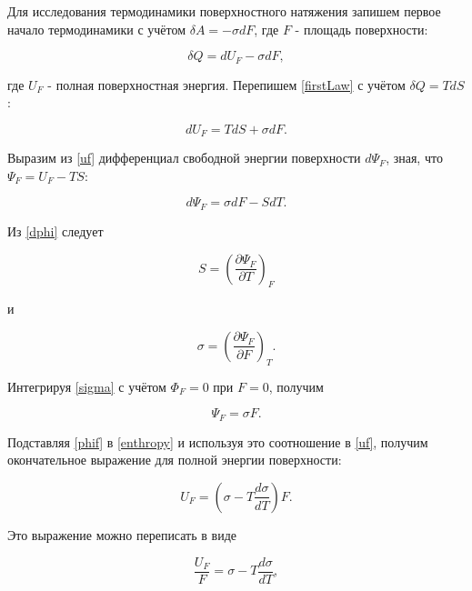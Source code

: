 \documentclass[a4paper,12pt]{article} %
\begin{document}
Для исследования термодинамики поверхностного натяжения запишем первое начало термодинамики с учётом $\delta A = -\sigma dF$, где $F$ - площадь поверхности:

\begin{equation}
    \delta Q = dU_F - \sigma dF,
    \label{firstLaw}
\end{equation}

где $U_F$ - полная поверхностная энергия. Перепишем \eqref{firstLaw} с учётом $\delta Q = TdS$:

\begin{equation}
    dU_F = TdS + \sigma dF.
    \label{uf}
\end{equation}

Выразим из \eqref{uf} дифференциал свободной энергии поверхности $d\Psi_F$, зная, что $\Psi_F = U_F - TS$:

\begin{equation}
    d\Psi_F = \sigma dF - SdT.
    \label{dphi}
\end{equation}

Из \eqref{dphi} следует

\begin{equation}
    S = (\frac{\partial\Psi_F}{\partial T})_F
    \label{enthropy}
\end{equation}

и

\begin{equation}
    \sigma = (\frac{\partial\Psi_F}{\partial F})_T.
    \label{sigma}
\end{equation}

Интегрируя \eqref{sigma} с учётом $\Phi_F = 0$ при $F = 0$, получим

\begin{equation}
    \Psi_F = \sigma F.
    \label{phif}
\end{equation}

Подставляя \eqref{phif} в \eqref{enthropy} и используя это соотношение в \eqref{uf}, получим окончательное выражение для полной энергии поверхности:

\begin{equation}
    U_F = (\sigma - T\frac{d\sigma}{dT})F.
\end{equation}

Это выражение можно переписать в виде

\begin{equation}
    \frac{U_F}{F} = \sigma - T\frac{d\sigma}{dT},
    \label{surfaceEnergy}
\end{equation}
\end{document}
